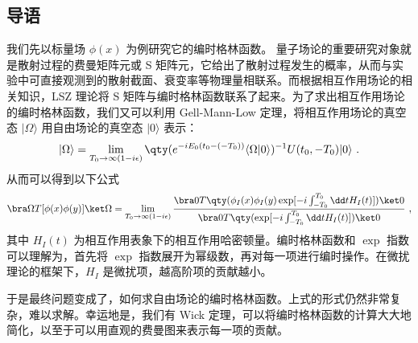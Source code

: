 
\subsection{导语}
我们先以标量场 $\phi(x)$ 为例研究它的编时格林函数。
量子场论的重要研究对象就是散射过程的费曼矩阵元或 S 矩阵元，它给出了散射过程发生的概率，从而与实验中可直接观测到的散射截面、衰变率等物理量相联系。而根据相互作用场论的相关知识，LSZ 理论将 S 矩阵与编时格林函数联系了起来。为了求出相互作用场论的编时格林函数，我们又可以利用 Gell-Mann-Low 定理，将相互作用场论的真空态 $|\Omega\rangle$ 用自由场论的真空态 $|0\rangle$ 表示：
\begin{equation}
|\Omega\rangle = \lim\limits_{T_0\rightarrow \infty(1-i\epsilon)}\qty(e^{-iE_0(t_0-(-T_0))}\langle \Omega|0\rangle )^{-1}U(t_0,-T_0)|0\rangle~.
\end{equation}
从而可以得到以下公式
\begin{equation}
\bra\Omega T[\phi(x)\phi(y)]\ket\Omega = \lim\limits_{T_0\rightarrow \infty(1-i\epsilon)}\frac{\bra 0 T\qty(\phi_I(x)\phi_I(y)\exp[-i\int_{-T_0}^{T_0}\dd t H_I(t)])\ket 0}{\bra 0 T\qty(\exp[-i\int_{-T_0}^{T_0}\dd t H_I(t)])\ket 0}~,
\end{equation}
其中 $H_I(t)$ 为相互作用表象下的相互作用哈密顿量。编时格林函数和 $\exp$ 指数可以理解为，首先将 $\exp$ 指数展开为幂级数，再对每一项进行编时操作。在微扰理论的框架下，$H_I$ 是微扰项，越高阶项的贡献越小。

于是最终问题变成了，如何求自由场论的编时格林函数。上式的形式仍然非常复杂，难以求解。幸运地是，我们有 Wick 定理，可以将编时格林函数的计算大大地简化，以至于可以用直观的费曼图来表示每一项的贡献。

